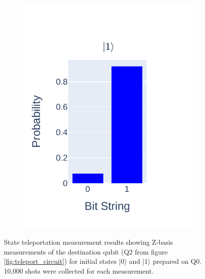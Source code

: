 \documentclass[journal]{IEEEtran}
\begin{document}
\begin{figure}
\begin{subfigure}{0.2\textwidth}
        \includegraphics[scale=0.8, trim={35 20 10 25}, clip]{figures/state_teleport/one_results.pdf}
    \end{subfigure}

    \caption{State teleportation measurement results showing Z-basis measurements of the destination qubit (Q2 from figure \ref{fig:teleport_circuit}) for initial states $|0 \rangle$ and $|1 \rangle$ prepared on Q0. 10,000 shots were collected for each measurement.}

    \label{fig:teleport_01_plots}
\end{figure}
\end{document}
